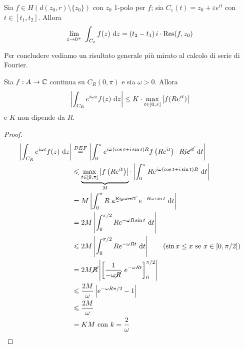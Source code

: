 \begin{coro}
Sia $f\in H(d(z_0,r)\setminus\{z_0\})$ con $z_0$ 1-polo per $f$; sia $C_{\varepsilon}(t)=z_0+\varepsilon e^{it}$ con $t\in[t_1,t_2]$. Allora
\begin{equation*}
\lim_{\varepsilon\rightarrow 0^+}\ \int_{C_{\varepsilon}} f(z)\dz = (t_2-t_1)\,i\cdot\Res(f,z_0) 
\end{equation*}
\end{coro}

Per concludere vediamo un risultato generale più mirato al calcolo di serie di Fourier.

\begin{lemma}[di Jordan]
Sia $f:A\to\mathbb{C}$ continua su $C_R(0,\pi)$ e sia $\omega>0$. Allora
\begin{equation*}
\left| \int_{C_R} e^{i\omega z}f(z)\  \mathrm{d} z \right| \leq K\cdot \max_{t\in[0,\pi]}\left|f(Re^{it})\right|
\end{equation*}
e $K$ non dipende da $R$.
\end{lemma}


\begin{proof}\leavevmode
\begin{equation*}
\begin{aligned}
\left|\int_{C_R} e^{i \omega t} f(z) \  \mathrm{d} z\right| &\stackrel{D E F}{=}\left|\int_0^\pi e^{i \omega(\cos t+i \sin t) R} f\left(R e^{i t}\right) \cdot R \cancel{i e^{i t}} \  \mathrm{d} t\right|\\
&\leqslant \underbrace{\max _{t \in[0, \pi]}\left|f\left(R e^{i t}\right)\right|}_M\cdot\left|\int_0^\pi Re^{i \omega(\cos t+i \sin t) R} \  \mathrm{d} t\right|\\
&=M\left|\int_0^\pi R\ \cancel{e^{\text {Ri}\omega \cos t}}\ e^{-R \omega \sin t} \  \mathrm{d} t\right|\\
&=2 M\left|\int_0^{\pi / 2} R e^{-\omega R \sin t} \  \mathrm{d} t\right|\\
&\leqslant 2 M\left|\int_0^{\pi / 2} R e^{-\omega R t} \  \mathrm{d} t\right| \qquad \left(\sin x\leq x\text{ se } x\in[0,\pi/2]\right)\\
&=2 M \cancel{R}\left|\left[\frac{1}{-\omega \cancel{R}}\ e^{-\omega R t}\right]_0^{\pi / 2}\right|\\
&\leqslant \frac{2 M}{\omega}\left|e^{-\omega R \pi / 2}-1\right|\\
&\leqslant \frac{2 M}{\omega}\\
&=K M \text { con } k=\frac{2}{\omega}
\end{aligned}
\end{equation*}
\end{proof}


